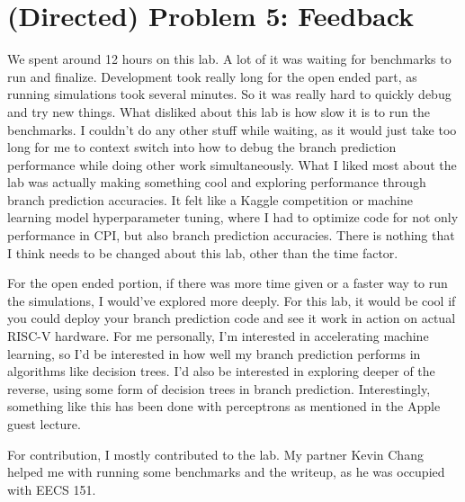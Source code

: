 \documentclass[11pt]{article}
\begin{document}
\section*{(Directed) Problem 5: Feedback}
We spent around 12 hours on this lab. A lot of it was waiting for benchmarks to run and finalize. Development took really long for the open ended part, as running simulations took several minutes. So it was really hard to quickly debug and try new things. What disliked about this lab is how slow it is to run the benchmarks. I couldn't do any other stuff while waiting, as it would just take too long for me to context switch into how to debug the branch prediction performance while doing other work simultaneously. What I liked most about the lab was actually making something cool and exploring performance through branch prediction accuracies. It felt like a Kaggle competition or machine learning model hyperparameter tuning, where I had to optimize code for not only performance in CPI, but also branch prediction accuracies. There is nothing that I think needs to be changed about this lab, other than the time factor.

For the open ended portion, if there was more time given or a faster way to run the simulations, I would've explored more deeply. For this lab, it would be cool if you could deploy your branch prediction code and see it work in action on actual RISC-V hardware. For me personally, I'm interested in accelerating machine learning, so I'd be interested in how well my branch prediction performs in algorithms like decision trees. I'd also be interested in exploring deeper of the reverse, using some form of decision trees in branch prediction. Interestingly, something like this has been done with perceptrons as mentioned in the Apple guest lecture.

For contribution, I mostly contributed to the lab. My partner Kevin Chang helped me with running some benchmarks and the writeup, as he was occupied with EECS 151.



\end{document}
